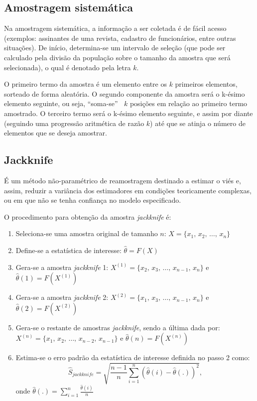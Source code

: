 \documentclass[
]{estat/estat}
\providecommand{\tightlist}{%
  \setlength{\itemsep}{0pt}\setlength{\parskip}{0pt}}\usepackage{longtable,booktabs,array}
\begin{document}
\subsection{Amostragem sistemática}\label{amostragem-sistemuxe1tica}

Na amostragem sistemática, a informação a ser coletada é de fácil acesso
(exemplos: assinantes de uma revista, cadastro de funcionários, entre
outras situações). De início, determina-se um intervalo de seleção (que
pode ser calculado pela divisão da população sobre o tamanho da amostra
que será selecionada), o qual é denotado pela letra \(k\).

O primeiro termo da amostra é um elemento entre os \(k\) primeiros
elementos, sorteado de forma aleatória. O segundo componente da amostra
será o k-ésimo elemento seguinte, ou seja, ``soma-se'' \(\:\) \(k\)
posições em relação ao primeiro termo amostrado. O terceiro termo será o
k-ésimo elemento seguinte, e assim por diante (seguindo uma progressão
aritmética de razão \(k\)) até que se atinja o número de elementos que
se deseja amostrar.

\subsection{Jackknife}\label{jackknife}

É um método não-paramétrico de reamostragem destinado a estimar o viés
e, assim, reduzir a variância dos estimadores em condições teoricamente
complexas, ou em que não se tenha confiança no modelo especificado.

O procedimento para obtenção da amostra \emph{jackknife} é:

\begin{enumerate}
\def\labelenumi{\arabic{enumi}.}
\tightlist
\item
  Seleciona-se uma amostra original de tamanho \(n\):
  \(X = \{x_1, \, x_2, \, \ldots, \, x_n\}\)
\item
  Define-se a estatística de interesse: \(\hat{\theta} = F(X)\)
\item
  Gera-se a amostra \emph{jackknife} 1:
  \(X^{(1)} = \{x_2, \, x_3, \, \ldots, \, x_{n-1}, \, x_n\}\) e
  \(\hat{\theta}(1) = F(X^{(1)})\)
\item
  Gera-se a amostra \emph{jackknife} 2:
  \(X^{(2)} = \{x_1, \, x_3, \, \ldots, \, x_{n-1}, \, x_n\}\) e
  \(\hat{\theta}(2) = F(X^{(2)})\)
\item
  Gera-se o restante de amostras \emph{jackknife}, sendo a última dada
  por: \(X^{(n)} = \{x_1, \, x_2, \, \ldots, \, x_{n-2}, \, x_{n-1}\}\)
  e \(\hat{\theta}(n) = F(X^{(n)})\)
\item
  Estima-se o erro padrão da estatística de interesse definida no passo
  2 como:
  \[\hat{S}_{jackknife} = \sqrt{\frac{n-1}{n}\sum_{i=1}^{n}\left(\hat{\theta}(i)-\hat{\theta}(.)\right)^2},\]
  onde \(\hat{\theta}(.)=\sum_{i=1}^{n}\frac{\hat{\theta}(i)}{n}\)
\end{enumerate}
\end{document}
